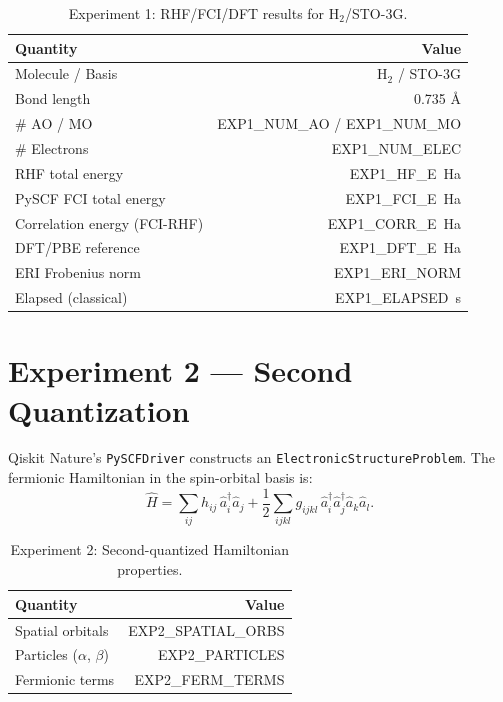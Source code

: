 \documentclass[11pt,a4paper]{article}
\begin{document}
\begin{table}[H]
\centering\small
\begin{tabular}{lr}
\toprule
Quantity & Value \\
\midrule
Molecule / Basis           & H$_2$ / STO-3G \\
Bond length                & 0.735 \AA \\
\# AO / MO                 & EXP1\_NUM\_AO / EXP1\_NUM\_MO \\
\# Electrons               & EXP1\_NUM\_ELEC \\
RHF total energy           & EXP1\_HF\_E~Ha \\
PySCF FCI total energy     & EXP1\_FCI\_E~Ha \\
Correlation energy (FCI-RHF)& EXP1\_CORR\_E~Ha \\
DFT/PBE reference          & EXP1\_DFT\_E~Ha \\
ERI Frobenius norm         & EXP1\_ERI\_NORM \\
Elapsed (classical)        & EXP1\_ELAPSED~s \\
\bottomrule
\end{tabular}
\caption{Experiment 1: RHF/FCI/DFT results for H$_2$/STO-3G.}
\end{table}

\section{Experiment 2 --- Second Quantization}

Qiskit Nature's \texttt{PySCFDriver} constructs an
\texttt{ElectronicStructureProblem}. The fermionic Hamiltonian in the
spin-orbital basis is:
\begin{equation}
  \hat{H} = \sum_{ij} h_{ij}\,\hat{a}_i^\dagger\hat{a}_j
  + \frac{1}{2}\sum_{ijkl} g_{ijkl}\,
    \hat{a}_i^\dagger\hat{a}_j^\dagger\hat{a}_k\hat{a}_l.
\end{equation}

\begin{table}[H]
\centering\small
\begin{tabular}{lr}
\toprule
Quantity & Value \\
\midrule
Spatial orbitals          & EXP2\_SPATIAL\_ORBS \\
Particles ($\alpha$, $\beta$) & EXP2\_PARTICLES \\
Fermionic terms           & EXP2\_FERM\_TERMS \\
\bottomrule
\end{tabular}
\caption{Experiment 2: Second-quantized Hamiltonian properties.}
\end{table}
\end{document}
